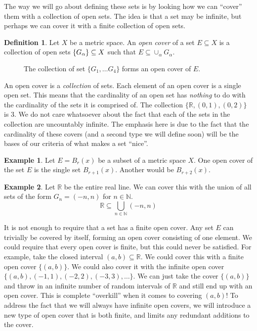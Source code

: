 \documentclass{article}
\newcommand{\N}{\mathbb{N}}
\newcommand{\R}{\mathbb{R}}
\theoremstyle{definition}
\newtheorem{definition}{Definition}[section]
\newtheorem{example}{Example}[section]
\begin{document}
	The way we will go about defining these sets is by looking how we can ``cover'' them with a collection of open sets. The idea is that a set may be infinite, but perhaps we can cover it with a finite collection of open sets. 
	\begin{definition}\label{def2.17}
		Let $ X $ be a metric space. An \textit{\color{red}open cover} of a set $ E\subseteq X $ is a collection of open sets $ \mathcal\{G_\alpha\}\subseteq X $ such that $ E\subseteq\cup_\alpha G_\alpha $.  
	\end{definition}
	\begin{figure}[h]
		\centering
		\caption{The collection of set $ \{G_1,\ldots G_4\} $ forms an open cover of $ E $.} 
	\end{figure}
	An open cover is a \textit{collection} of sets. Each element of an open cover is a single open set. This means that the cardinality of an open set has \textit{nothing} to do with the cardinality of the sets it is comprised of. The collection $ \{\R,(0,1),(0,2)\} $ is 3. We do not care whatsoever about the fact that each of the sets in the collection are uncountably infinite. The emphasis here is due to the fact that the cardinality of these covers (and a second type we will define soon) will be the bases of our criteria of what makes a set ``nice''.
	\begin{example}
		Let $ E=B_r(x) $ be a subset of a metric space $ X $. One open cover of the set $ E $ is the single set $ B_{r+1}(x) $. Another would be $ B_{r+2}(x) $. 
	\end{example}
	\begin{example}
		Let $ \R $ be the entire real line. We can cover this with the union of all sets of the form $G_n=(-n,n)$ for $ n\in\N $. $$ \R\subseteq\bigcup_{n\in \N}(-n,n)$$
	\end{example}
	It is not enough to require that a set has a finite open cover. Any set $ E $ can trivially be covered by itself, forming an open cover consisting of one element. We could require that every open cover is finite, but this could never be satisfied. For example, take the closed interval $ (a,b)\subseteq\R $. We could cover this with a finite open cover $ \{(a,b)\} $. We could also cover it with the infinite open cover $ \{(a,b),(-1,1),(-2,2),(-3,3),\ldots\} $. We can just take the cover $ \{(a,b)\} $ and throw in an infinite number of random intervals of $ \R $ and still end up with an open cover. This is complete ``overkill'' when it comes to covering $ (a,b) $! To address the fact that we will always have infinite open covers, we will introduce a new type of open cover that is both finite, and limits any redundant additions to the cover. 
	
\end{document}
